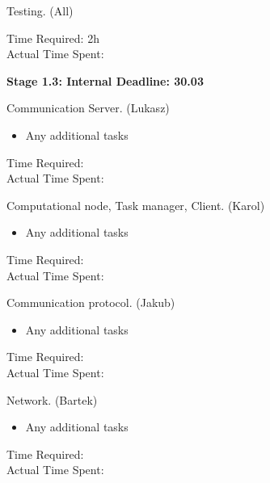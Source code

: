 \documentclass{article}
\begin{document}
\begin{itemize}
\begin{itemize}
\begin{enumerate}
			
					{\bf \item Testing. (All) \\}
					Time Required: 2h \\ 
					Actual Time Spent: \\
										
			\end{enumerate}
			
			\newpage
			
			{\item \large \bf Stage 1.3: Internal Deadline: 30.03 \\ }
			\begin{enumerate}
			
					{\bf \item Communication Server. (Lukasz) }
					\begin{itemize} [label=$\bullet$]
							\item Any additional tasks
					\end{itemize}
					Time Required: \\ 
					Actual Time Spent: \\
					
					{\bf \item Computational node, Task manager, Client. (Karol)}
					\begin{itemize} [label=$\bullet$]
							\item Any additional tasks
					\end{itemize}		
					Time Required: \\ 
					Actual Time Spent: \\
			
			
					{\bf \item Communication protocol. (Jakub)}
					\begin{itemize} [label=$\bullet$]
							\item Any additional tasks
					\end{itemize}
					Time Required: \\ 
					Actual Time Spent: \\
			
			
					{\bf \item Network. (Bartek) }
					\begin{itemize} [label=$\bullet$]
							\item Any additional tasks
					\end{itemize}
					Time Required: \\ 
					Actual Time Spent: \\
			

\end{enumerate}
\end{itemize}
\end{itemize}
\end{document}
